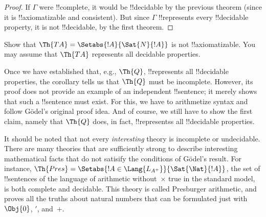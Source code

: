 \documentclass[../../../include/open-logic-section]{subfiles}
\begin{document}
\begin{proof}
If $\Gamma$ were !!{complete}, it would be !!{decidable} by the
previous theorem (since it is !!{axiomatizable} and consistent). But
since $\Gamma$ !!{represents} every !!{decidable} property, it is not
!!{decidable}, by the first theorem.
\end{proof}

\begin{prob}
Show that $\Th{TA} = \Setabs{!A}{\Sat{N}{!A}}$ is not
!!{axiomatizable}. You may assume that $\Th{TA}$ represents all
decidable properties.
\end{prob}

Once we have established that, e.g., $\Th{Q}$, !!{represents} all
!!{decidable} properties, the corollary tells us that $\Th{Q}$ must be
incomplete. However, its proof does not provide an example of an
independent !!{sentence}; it merely shows that such a !!{sentence}
must exist. For this, we have to arithmetize syntax and follow
G\"odel's original proof idea.  And of course, we still have to show
the first claim, namely that $\Th{Q}$ does, in fact, !!{represents}s
all !!{decidable} properties.

It should be noted that not every \emph{interesting} theory is
incomplete or undecidable. There are many theories that are
sufficiently strong to describe interesting mathematical facts that do
not satisify the conditions of G\"odel's result. For instance,
$\Th{Pres} = \Setabs{!A \in \Lang{L_{A^+}}}{\Sat{\Nat}{!A}}$, the set of
!!{sentence}s of the language of arithmetic without~$\times$ true in
the standard model, is both complete and decidable. This theory is
called Presburger arithmetic, and proves all the truths about natural
numbers that can be formulated just with $\Obj{0}$, $\prime$, and~$+$.
\end{document}
